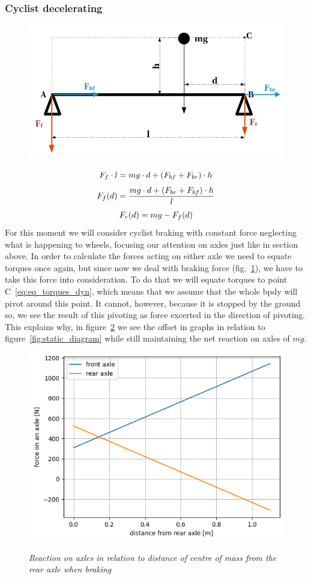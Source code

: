 \documentclass[12pt, a4]{article}
\begin{document}
\subsubsection{Cyclist decelerating}\label{theory_force_distro_dynamic}
\begin{figure}[H]
\centering
\caption{}
\includegraphics[width=0.5\linewidth]{decelerating_forces_diagram}%
\label{fig:deceleration_diagram}
\end{figure}
\begin{equation}
\centering%
\label{eq:eq_torques_dyn}
F_f \cdot l = mg \cdot d + (F_{bf} + F_{br}) \cdot h
\end{equation}
\begin{equation}
\centering%
\label{eq:eq_torques_dyn}
F_f(d) = \frac{mg \cdot d + (F_{br} + F_{bf}) \cdot h}{l}
\end{equation}
\begin{equation}
\centering%
\label{eq:eq_torques_dyn}
F_r(d) = mg - F_f(d)
\end{equation}
For this moment we will consider cyclist braking with constant force neglecting what is happening to wheels, focusing
our attention on axles just like in section above. In order to calculate the forces acting on either axle we need to equate
torques once again, but since now we deal with braking force (fig.~\ref{fig:deceleration_diagram}), we have to take this force 
into consideration. To do that we will equate torques to point C~\eqref{eq:eq_torques_dyn}, which means that we assume that the 
whole bpdy will pivot around this point. It cannot, however, because it is stopped by the ground so, we see the result of this pivoting 
as force excerted in the direction of pivoting. This explains why, in figure~\ref{fig:dynamic_graph} we see the offset in graphs 
in relation to figure~\ref{fig:static_diagram} while still maintaining the net reaction on axles of $mg$.
\begin{figure}[H]
\centering
\caption{\textit{Reaction on axles in relation to distance of centre of mass from the rear axle when braking}}
\includegraphics[width=0.5\linewidth]{axles_dynamic_graph}%
\label{fig:dynamic_graph}
\end{figure}
\end{document}
